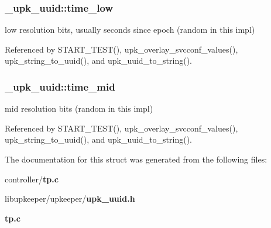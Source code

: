 \subsubsection[{time\_\-low}]{ {\bf \_\-upk\_\-uuid::time\_\-low}}\label{struct__upk__uuid_aeefcd7db5971c45ca97b83f724501ca9}
low resolution bits, usually seconds since epoch (random in this impl) 

Referenced by START\_\-TEST(), upk\_\-overlay\_\-svcconf\_\-values(), upk\_\-string\_\-to\_\-uuid(), and upk\_\-uuid\_\-to\_\-string().

\subsubsection[{time\_\-mid}]{ {\bf \_\-upk\_\-uuid::time\_\-mid}}\label{struct__upk__uuid_a8f552d485307182b23619be222cd4fc8}
mid resolution bits (random in this impl) 

Referenced by START\_\-TEST(), upk\_\-overlay\_\-svcconf\_\-values(), upk\_\-string\_\-to\_\-uuid(), and upk\_\-uuid\_\-to\_\-string().



The documentation for this struct was generated from the following files:\begin{DoxyCompactItemize}
\item 
controller/{\bf tp.c}\item 
libupkeeper/upkeeper/{\bf upk\_\-uuid.h}\item 
{\bf tp.c}\end{DoxyCompactItemize}
